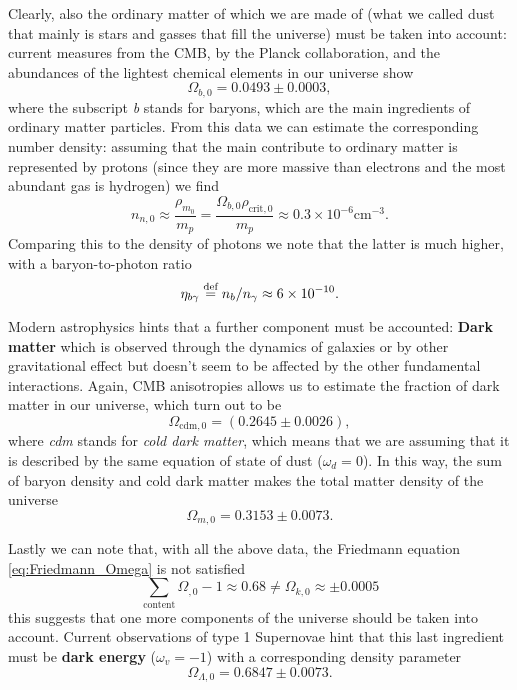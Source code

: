 Clearly, also the ordinary matter of which we are made of (what we called dust that mainly is stars and gasses that fill the universe) must be taken into account: current measures \cite{planck2018results} from the CMB, by the Planck collaboration, and the abundances of the lightest chemical elements in our universe show 
\begin{equation}
    \Omega_{b,0}=0.0493\pm0.0003,
\end{equation}
where the subscript \emph{b} stands for baryons, which are the main ingredients of ordinary matter particles.
From this data we can estimate the corresponding number density: assuming that the main contribute to ordinary matter is represented by protons (since they are more massive than electrons and the most abundant gas is hydrogen) we find $$n_{n,0}\approx\frac{\rho_{m_0}}{m_p}=\frac{\Omega_{b,0}\rho_{\text{crit},0}}{m_p}\approx0.3\times10^{-6}\text{cm}^{-3}.$$ Comparing this to the density of photons we note that the latter is much higher, with a baryon-to-photon ratio
\begin{equation}
    \label{eq:baryon-to.photon_ratio}
    \eta_{b\gamma}\stackrel{\text{def}}{=} n_b/n_\gamma\approx6\times10^{-10}.
\end{equation}

Modern astrophysics hints that a further component must be accounted: \textbf{Dark matter} which is observed through the dynamics of galaxies or by other gravitational effect but doesn't seem to be affected by the other fundamental interactions. Again, CMB anisotropies allows us to estimate the fraction of dark matter in our universe, which turn out to be \cite{planck2018results}
\begin{equation}
    \Omega_{\text{cdm},0} =(0.2645\pm0.0026),
\end{equation}
 where \emph{cdm} stands for \emph{cold dark matter}, which means that we are assuming that it is described by the same equation of state of dust ($\omega_d=0$). In this way, the sum of baryon density and cold dark matter makes the total matter density of the universe \cite{planck2018results}
\begin{equation}
    \Omega_{m,0}=0.3153\pm0.0073.
\end{equation}

Lastly we can note that, with all the above data, the Friedmann equation \eqref{eq:Friedmann_Omega} is not satisfied $$\sum_{\text{content}}\Omega_{,0}-1\approx0.68\neq\Omega_{k,0}\approx\pm0.0005 $$this suggests that one more components of the universe should be taken into account. Current observations of type 1 Supernovae hint that this last ingredient must be \textbf{dark energy} ($\omega_v=-1$) with a corresponding density parameter \cite{planck2018results}
$$\Omega_{\Lambda,0}=0.6847\pm0.0073.$$

